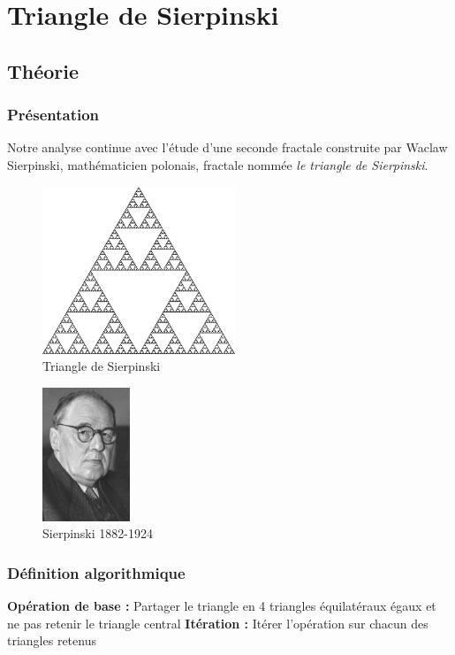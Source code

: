 \documentclass[a4paper,10pt]{report}
\begin{document}
\section{Triangle de Sierpinski}
\subsection{Théorie}
\subsubsection{Présentation}
\begin{minipage}[c]{.70\linewidth}
	\indent Notre analyse continue avec l'étude d'une seconde fractale construite par Waclaw Sierpinski, mathématicien polonais, fractale nommée \textit{le triangle de Sierpinski}.
	\begin{figure}[H]
	\centering
	\caption{Triangle de Sierpinski}
	\includegraphics[height=5cm]{sierpinski.png}
	\end{figure}
\end{minipage} \hfill
\begin{minipage}[c]{.05\linewidth}
\end{minipage} \hfill
\begin{minipage}[c]{.21\linewidth}
	\begin{figure}[H]
	\includegraphics[height=4cm]{mr_sierpinski.jpg}
	\caption{Sierpinski 1882-1924}
	\end{figure}
\end{minipage}

\subsubsection{Définition algorithmique}
\begin{algorithm}
\begin{algorithmic}
\STATE \textbf{Opération de base :} Partager le triangle en 4 triangles équilatéraux égaux et ne pas retenir le triangle central
\STATE \textbf{Itération :} Itérer l'opération sur chacun des triangles retenus
\end{algorithmic}
\end{algorithm}
\end{document}
